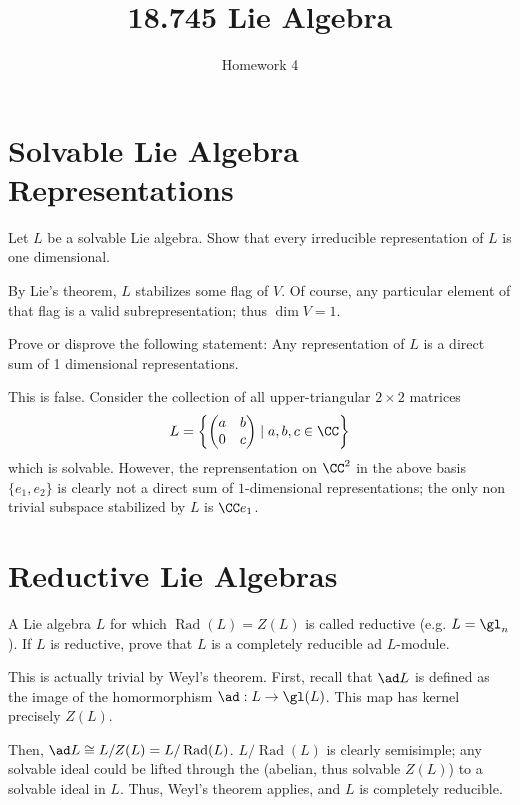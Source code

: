 \documentclass[11pt, headheight=30pt]{scrartcl}
\title{18.745 Lie Algebra}
\subtitle{Homework 4}
\DeclareMathOperator{\Rad}{Rad}
\begin{document}
\section{Solvable Lie Algebra Representations}

\begin{prob}
    Let $L$ be a solvable Lie algebra.
    Show that every irreducible representation of $L$ is one dimensional.
\end{prob}
By Lie's theorem, $L$ stabilizes some flag of $V$. Of course, any particular
element of that flag is a valid subrepresentation; thus $\dim V = 1$.

\begin{prob}
    Prove or disprove the following statement:
    Any representation of $L$ is a direct sum of 1 dimensional representations.
\end{prob}
This is false. Consider the collection of all upper-triangular
$2\times 2$ matrices
\[
    L = \left\{
        \begin{pmatrix}
            a & b \\
            0 & c
        \end{pmatrix}
        \mid a, b, c \in \CC
    \right\}    
\]
which is solvable. However, the reprensentation on $\CC^2$
in the above basis $\{e_1, e_2\}$ is clearly not a direct
sum of $1$-dimensional representations; the only non trivial
subspace stabilized by $L$ is $\CC e_1$.

\section{Reductive Lie Algebras}
\begin{prob}
    A Lie algebra $L$ for which $\Rad(L) = Z(L)$ is called reductive (e.g. $L = \gl_n$).
    If $L$ is reductive, prove that $L$ is a completely reducible ad $L$-module.
\end{prob}
This is actually trivial by Weyl's theorem. First, recall
that $\ad L$ is defined as the image of the homormorphism
$\ad:L\to \gl(L)$. This map has kernel precisely $Z(L)$.

Then, $\ad L\cong L / Z(L) = L / \Rad(L)$. $L/\Rad(L)$
is clearly semisimple; any solvable ideal could be lifted through
the (abelian, thus solvable $Z(L)$) to a solvable ideal in $L$.
Thus, Weyl's theorem applies, and $L$ is completely reducible.
\end{document}
